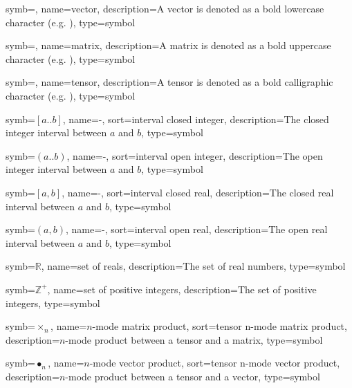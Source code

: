 
{
    symb=,
name=vector,
description={A vector is denoted as a bold lowercase character (e.g. )},
type=symbol
}

{
    symb=,
name=matrix,
description={A matrix is denoted as a bold uppercase character (e.g. )},
type=symbol
}

{
    symb=,
name=tensor,
description={A tensor is denoted as a bold calligraphic character (e.g. )},
type=symbol
}

{
    symb=\ensuremath{[a..b]},
name=-,
sort={interval closed integer},
description={The closed integer interval between $a$ and $b$},
type=symbol
}

{
    symb=\ensuremath{(a..b)},
name=-,
sort={interval open integer},
description={The open integer interval between $a$ and $b$},
type=symbol
}

{
    symb=\ensuremath{[a, b]},
name=-,
sort={interval closed real},
description={The closed real interval between $a$ and $b$},
type=symbol
}

{
    symb=\ensuremath{(a, b)},
name=-,
sort={interval open real},
description={The open real interval between $a$ and $b$},
type=symbol
}

{
    symb=\ensuremath{\mathbb{R}},
name=set of reals,
description={The set of real numbers},
type=symbol
}

{
    symb=\ensuremath{\mathbb{Z} ^ +},
name=set of positive integers,
description={The set of positive integers},
type=symbol
}

{
    symb=\ensuremath{\times_n},
name={$n$-mode matrix product},
sort={tensor n-mode matrix product},
description={$n$-mode product between a tensor and a matrix},
type=symbol
}

{
    symb=\ensuremath{\bullet_n},
name={$n$-mode vector product},
sort={tensor n-mode vector product},
description={$n$-mode product between a tensor and a vector},
type=symbol
}

